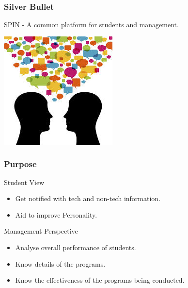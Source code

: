 \documentclass[14pt]{beamer}
\begin{document}
\begin{frame}

\frametitle{Silver Bullet}

SPIN - A common platform for students and management.

	\begin{center}

		\includegraphics[scale = 0.4]{interact.jpeg}

	\end{center}

\end{frame}


\begin{frame}

\frametitle{Purpose}

\begin{block}{Student View}

	\begin{itemize}
	
	\item Get notified with tech and non-tech information.
	
	\item Aid to improve Personality.
	
	\end{itemize}

\end{block}

\begin{block}{Management Perspective}

	\begin{itemize}

		\item Analyse overall performance of students.

		\item Know details of the programs. 

		\item Know the effectiveness of the programs being conducted.

	\end{itemize}

\end{block}

\end{frame}
\end{document}
